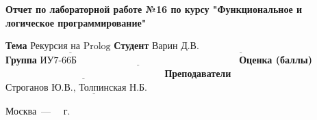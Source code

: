 \begin{titlepage}
	
	\begin{center}
		\Large\textbf{Отчет по лабораторной работе №16 по курсу "Функциональное и логическое программирование"}\newline
	\end{center}
	
	\noindent\textbf{Тема} $\underline{\text{Рекурсия на Prolog}}$\newline\newline\newline
	\noindent\textbf{Студент} $\underline{\text{Варин Д.В.~~~~~~~~~~~~~~~~~~~~~~~~~~~~~~~~~~~~~~~~~}}$\newline\newline
	\noindent\textbf{Группа} $\underline{\text{ИУ7-66Б~~~~~~~~~~~~~~~~~~~~~~~~~~~~~~~~~~~~~~~~~~~~~~~~~~}}$\newline\newline
	\noindent\textbf{Оценка (баллы)} $\underline{\text{~~~~~~~~~~~~~~~~~~~~~~~~~~~~~~~~~~~~~~~~~~~~~~~~~}}$\newline\newline
	\noindent\textbf{Преподаватели} $\underline{\text{Строганов Ю.В., Толпинская Н.Б.~~~~~~~~~~~}}$\newline
	
	\begin{center}
		\vfill
		Москва~---~\the\year
		~г.
	\end{center}
 \restoregeometry
\end{titlepage}
